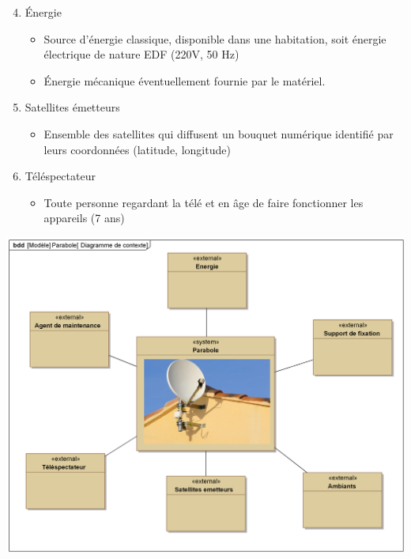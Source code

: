  \begin{minipage}{0.55\linewidth}
  \begin{enumerate}
  \setcounter{enumi}{3} 
 \item Énergie
 \begin{itemize}
  \item Source d'énergie classique, disponible dans une habitation, soit énergie électrique de nature EDF (220V, 50 Hz)
  \item Énergie mécanique éventuellement fournie par le matériel.
 \end{itemize}
 \item Satellites émetteurs
 \begin{itemize}
  \item Ensemble des satellites qui diffusent un bouquet numérique identifié par leurs coordonnées (latitude, longitude)
 \end{itemize}
 \item Téléspectateur
 \begin{itemize}
  \item Toute personne regardant la télé et en âge de faire fonctionner les appareils (7 ans)
 \end{itemize}
\end{enumerate}
 \end{minipage}
 \hfill
  \begin{minipage}{0.4\linewidth}
  \begin{center}
 \includegraphics[width=\linewidth]{img/Parabole_contexte}
\end{center}
 \end{minipage}


